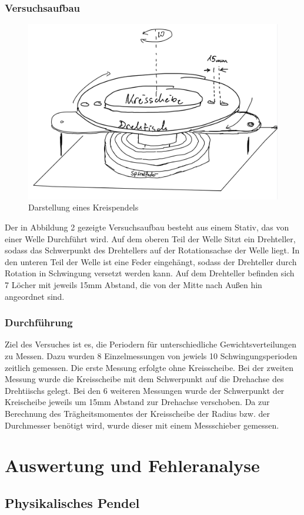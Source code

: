 \documentclass[11pt,a4paper]{article}
\begin{document}
     \subsubsection{Versuchsaufbau}
     \begin{figure}[H]
     	\includegraphics[width=0.6\linewidth]{Drehpendel.png}
     	\centering
     	\caption{Darstellung eines Kreispendels}
     \end{figure}
 Der in Abbildung 2 gezeigte Versuchsaufbau besteht aus einem Stativ, das von einer Welle Durchführt wird. Auf dem oberen Teil der Welle Sitzt ein Drehteller, sodass das Schwerpunkt des Drehtellers auf der Rotationsachse der Welle liegt. In den unteren Teil der Welle ist eine Feder eingehängt, sodass der Drehteller durch Rotation in Schwingung versetzt werden kann. Auf dem Drehteller befinden sich 7 Löcher mit jeweils 15mm Abstand, die von der Mitte nach Außen hin angeordnet sind.
     \subsubsection{Durchführung}
Ziel des Versuches ist es, die Periodern für unterschiedliche Gewichtsverteilungen zu Messen. Dazu wurden 8 Einzelmessungen von jewiels 10 Schwingungsperioden zeitlich gemessen.
Die erste Messung erfolgte ohne Kreisscheibe. Bei der zweiten Messung wurde die Kreisscheibe mit dem Schwerpunkt auf die Drehachse des Drehtiischs gelegt. Bei den 6 weiteren Messungen wurde der Schwerpunkt der Kreischeibe jeweils um 15mm Abstand zur Drehachse verschoben.
Da zur Berechnung des Trägheitsmomentes der Kreisscheibe der Radius bzw. der Durchmesser benötigt wird, wurde dieser mit einem Messschieber gemessen.
\section{Auswertung und Fehleranalyse}
	\subsection{Physikalisches Pendel}
\end{document}
